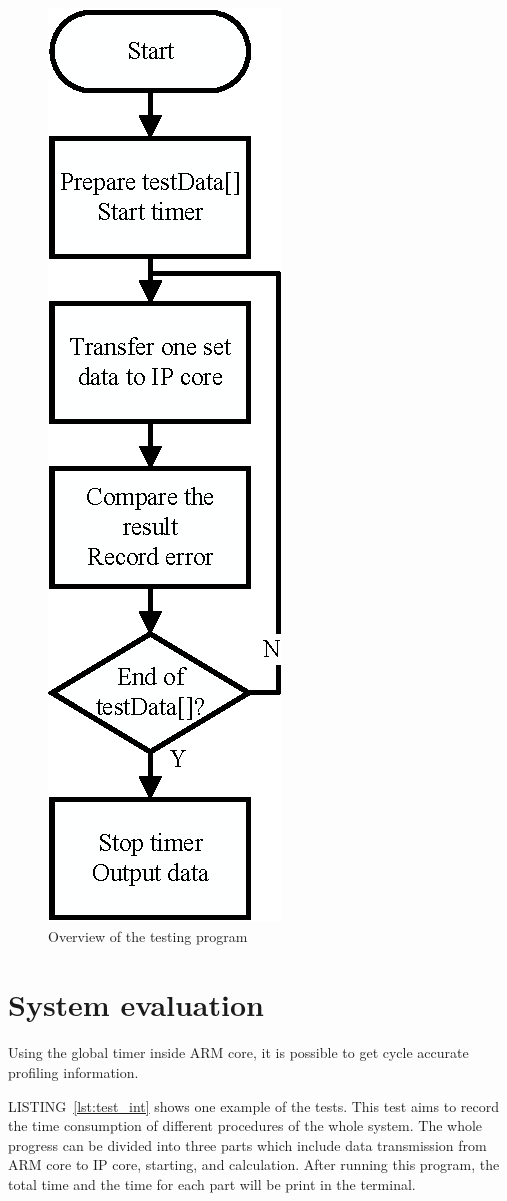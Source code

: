 \documentclass[journal]{IEEEtran}
\newcommand{\lref}[1]{LISTING~\ref{#1}}
\begin{document}
\begin{figure}[t]
	\centering
	\includegraphics[width=0.3\columnwidth]{sdk}
	\caption{Overview of the testing program}
	\label{fig:sdk}
\end{figure}

\section{System evaluation}

Using the global timer inside ARM core, it is possible to get cycle accurate profiling information.

\lref{lst:test_int} shows one example of the tests. This test aims to record the time consumption of different procedures of the whole system. The whole progress can be divided into three parts which include data transmission from ARM core to IP core, starting, and calculation. After running this program, the total time and the time for each part will be print in the terminal. 
\end{document}
